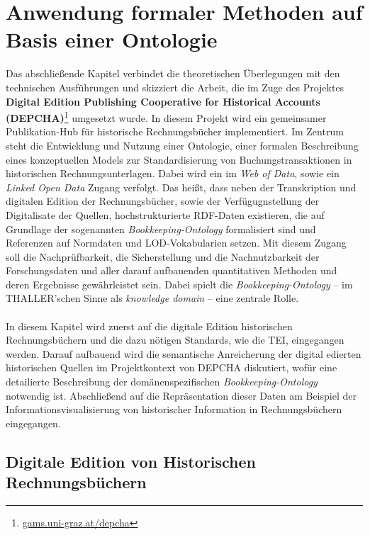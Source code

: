 \documentclass[12pt,a4paper]{article}
\begin{document}
\newpage
\section{Anwendung formaler Methoden auf Basis einer Ontologie}
\label{Umsetzung}

Das abschließende Kapitel verbindet die theoretischen Überlegungen mit den technischen Ausführungen und skizziert die Arbeit, die im Zuge des Projektes \textbf{Digital Edition Publishing Cooperative for Historical Accounts (DEPCHA)}\footnote{\url{gams.uni-graz.at/depcha}} umgesetzt wurde. In diesem Projekt wird ein gemeinsamer Publikation-Hub für historische Rechnungsbücher implementiert. Im Zentrum steht die Entwicklung und Nutzung einer Ontologie, einer formalen Beschreibung eines konzeptuellen Models zur Standardisierung von Buchungstransaktionen in historischen Rechnungsunterlagen. Dabei wird ein im \textit{Web of Data}, sowie ein \textit{Linked Open Data} Zugang verfolgt. Das heißt, dass neben der Transkription und digitalen Edition der Rechnungsbücher, sowie der Verfügugnstellung der Digitalisate der Quellen, hochstrukturierte RDF-Daten existieren, die auf Grundlage der sogenannten \textit{Bookkeeping-Ontology} formalisiert sind und Referenzen auf Normdaten und LOD-Vokabularien setzen. Mit diesem Zugang soll die Nachprüfbarkeit, die Sicherstellung und die Nachnutzbarkeit der Forschungsdaten und aller darauf aufbauenden quantitativen Methoden und deren Ergebnisse gewährleistet sein. Dabei spielt die \textit{Bookkeeping-Ontology} -- im THALLER'schen Sinne als \textit{knowledge domain} -- eine zentrale Rolle.
\\
\\
In diesem Kapitel wird zuerst auf die digitale Edition historischen Rechnungsbüchern und die dazu nötigen Standards, wie die TEI, eingegangen werden. Darauf aufbauend wird die semantische Anreicherung der digital edierten historischen Quellen im Projektkontext von DEPCHA diskutiert, wofür eine detailierte Beschreibung der domänenspezifischen \textit{Bookkeeping-Ontology} notwendig ist. Abschließend auf die Repräsentation dieser Daten am Beispiel der Informationsvisualisierung von historischer Information in Rechnungsbüchern eingegangen.

\subsection{Digitale Edition von Historischen Rechnungsbüchern}
\end{document}
